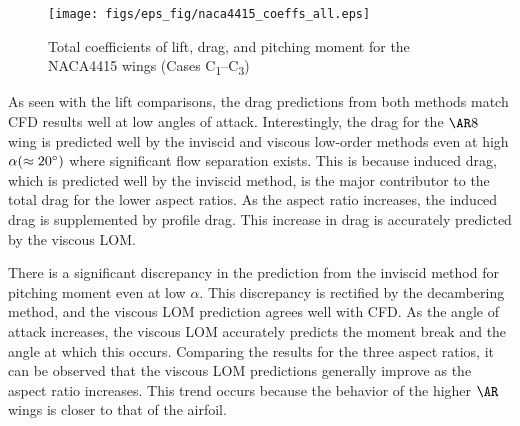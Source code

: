 

\begin{figure}[!h]
    \centering
    \texttt{[image: figs/eps\_fig/naca4415\_coeffs\_all.eps]}
    \caption{Total coefficients of lift, drag, and pitching moment  for the NACA4415 wings (Cases C\textsubscript{1}--C\textsubscript{3})}
    \label{fig:n4415-coeffs}
\end{figure}


As seen with the lift comparisons, the drag predictions from both methods match CFD results well at low angles of attack.
Interestingly, the drag for the $\ar{8}$ wing is predicted well by the inviscid and viscous low-order methods even at high $\alpha (\approx 20^\circ{})$ where significant flow separation exists. This is because induced drag, which is predicted well by the inviscid method, is the major contributor to the total drag for the lower aspect ratios. %
As the aspect ratio increases, the induced drag is supplemented by profile drag. This increase in drag is accurately predicted by the viscous LOM.


There is a significant discrepancy in the prediction from the inviscid method for pitching moment even at low $\alpha$. %
This discrepancy is rectified by the decambering method, and the viscous LOM prediction agrees well with CFD. As the angle of attack increases, the viscous LOM accurately predicts the moment break and the angle at which this occurs.
Comparing the results for the three aspect ratios, it can be observed that the viscous LOM predictions generally improve as the aspect ratio increases. This trend occurs because the behavior of the higher $\ar{}$ wings is closer to that of the airfoil.
